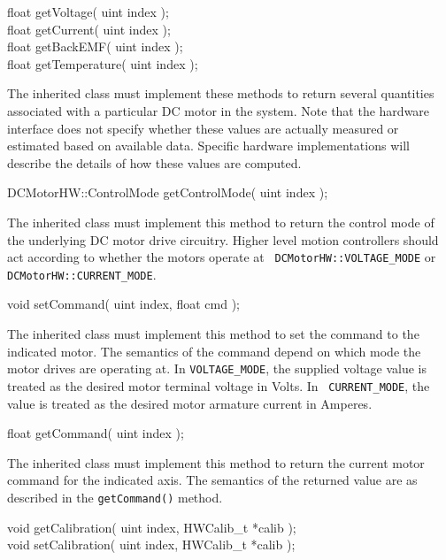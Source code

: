 \begin{prototype}
float getVoltage( uint index ); \\
float getCurrent( uint index ); \\
float getBackEMF( uint index ); \\
float getTemperature( uint index );
\end{prototype}

The inherited class must implement these methods to return several
quantities associated with a particular DC motor in the system. Note that
the hardware interface does not specify whether these values are actually
measured or estimated based on available data. Specific hardware
implementations will describe the details of how these values are computed.

\begin{prototype}
DCMotorHW::ControlMode getControlMode( uint index );
\end{prototype}

The inherited class must implement this method to return the control mode of
the underlying DC motor drive circuitry. Higher level motion controllers
should act according to whether the motors operate at {\tt
DCMotorHW::VOLTAGE\_MODE} or {\tt DCMotorHW::CURRENT\_MODE}.

\begin{prototype}
void setCommand( uint index, float cmd );
\end{prototype}

The inherited class must implement this method to set the command to the
indicated motor. The semantics of the command depend on which mode the motor
drives are operating at. In {\tt VOLTAGE\_MODE}, the supplied voltage value
is treated as the desired motor terminal voltage in Volts. In {\tt
CURRENT\_MODE}, the value is treated as the desired motor armature current
in Amperes.

\begin{prototype}
float getCommand( uint index );
\end{prototype}

The inherited class must implement this method to return the current motor
command for the indicated axis. The semantics of the returned value are as
described in the {\tt getCommand()} method.

\begin{prototype}
void getCalibration( uint index, HWCalib\_t *calib ); \\
void setCalibration( uint index, HWCalib\_t *calib );
\end{prototype}

